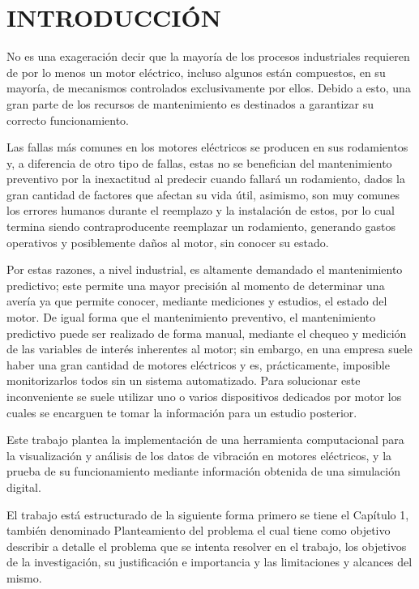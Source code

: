 \thispagestyle{empty}
\section{INTRODUCCIÓN}

No es una exageración decir que la mayoría de los procesos industriales
requieren de por lo menos un motor eléctrico, incluso algunos están compuestos, en su
mayoría, de mecanismos controlados exclusivamente por ellos. Debido a esto,
una gran parte de los recursos de mantenimiento es destinados a garantizar
su correcto funcionamiento.

Las fallas más comunes en los motores eléctricos se producen en sus rodamientos
y, a diferencia de otro tipo de fallas, estas no se benefician
del mantenimiento preventivo por la inexactitud al predecir cuando
fallará un rodamiento, dados la gran cantidad de factores que afectan su vida útil,
asimismo, son muy comunes los errores humanos durante el reemplazo y la instalación de
estos, por lo
cual termina siendo contraproducente reemplazar un rodamiento,
generando gastos operativos y posiblemente daños al motor,
sin conocer su estado.

Por estas razones, a nivel industrial, es altamente demandado el mantenimiento
predictivo; este permite una mayor precisión al momento de determinar una avería
ya que permite conocer, mediante mediciones y estudios, el estado del motor.
De igual forma que el mantenimiento preventivo, el mantenimiento predictivo puede
ser realizado de forma manual, mediante el chequeo y medición de las variables de
interés inherentes al motor; sin embargo, en una empresa suele haber una gran cantidad
de motores eléctricos y es, prácticamente, imposible monitorizarlos todos sin un sistema
automatizado. Para solucionar este inconveniente se suele utilizar
uno o varios dispositivos dedicados por motor los cuales se encarguen te tomar
la información para un estudio posterior.

Este trabajo plantea la implementación de una herramienta computacional para la
visualización y análisis de los datos de vibración en motores eléctricos, y la
prueba de su funcionamiento mediante información obtenida de una
simulación digital.

El trabajo está estructurado de la siguiente forma primero se tiene el Capítulo
1, también denominado Planteamiento del problema el cual tiene como objetivo
describir a detalle el problema que se intenta resolver en el trabajo, los
objetivos de la investigación, su justificación e importancia y las
limitaciones y alcances del mismo.

